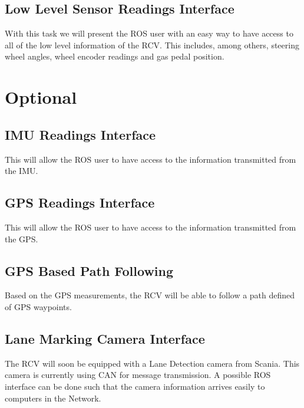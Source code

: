 \documentclass{article}
\begin{document}
\subsection{Low Level Sensor Readings Interface}

With this task we will present the ROS user with an easy way to have access to all of the low level information of the RCV. This includes, among others, steering wheel angles, wheel encoder readings and gas pedal position.

\section{Optional} 
 
\subsection{IMU Readings Interface}

This will allow the ROS user to have access to the information transmitted from the IMU.

\subsection{GPS Readings Interface}

This will allow the ROS user to have access to the information transmitted from the GPS.
 
\subsection{GPS Based Path Following}

Based on the GPS measurements, the RCV will be able to follow a path defined of GPS waypoints.
 
%

\subsection{Lane Marking Camera Interface}

The RCV will soon be equipped with a Lane Detection camera from Scania. This camera is currently using CAN for message transmission. A possible ROS interface can be done such that the camera information arrives easily to computers in the Network.
\end{document}
